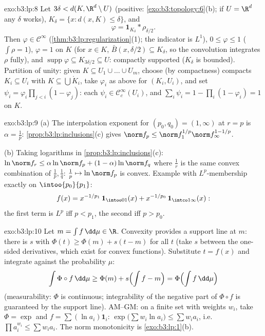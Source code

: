 \begin{solution}{exo:b3:lp:8}
Let $3\delta < d(K, \R^d\setminus U)$ (positive:
\cref{exo:b3:topology:6}(b); if $U = \R^d$ any $\delta$
works), $K_\delta = \{x : d(x, K) \leq \delta\}$, and
\[
\varphi = \mathbf 1_{K_\delta} * \rho_{\delta/2} .
\]
Then $\varphi \in \mathcal C^\infty$
(\cref{thm:b3:lp:regularization}(1); the indicator is $L^1$),
$0 \leq \varphi \leq 1$ ($\int\rho = 1$), $\varphi = 1$ on $K$
(for $x \in K$, $\bar B(x, \delta/2) \subseteq K_\delta$, so
the convolution integrates $\rho$ fully), and
$\operatorname{supp}\varphi \subseteq K_{3\delta/2} \subseteq
U$: compactly supported ($K_\delta$ is bounded). Partition of
unity: given $K \subseteq U_1\cup\dots\cup U_m$, choose (by
compactness) compacts $K_i \subseteq U_i$ with $K \subseteq
\bigcup \mathring K_i$, take $\varphi_i$ as above for $(K_i,
U_i)$, and set $\psi_i = \varphi_i\prod_{j <i}(1 -
\varphi_j)$: each $\psi_i \in \mathcal C_c^\infty(U_i)$, and
$\sum_i\psi_i = 1 - \prod_i(1 - \varphi_i) = 1$ on $K$.
\end{solution}

\begin{solution}{exo:b3:lp:9}
(a) The interpolation exponent for $(p_0, q_0) = (1, \infty)$
at $r = p$ is $\alpha = \frac1p$:
\cref{prop:b3:lp:inclusions}(c) gives $\norm f_p \leq \norm
f_1^{1/p}\norm f_\infty^{1 - 1/p}$.

(b) Taking logarithms in
\cref{prop:b3:lp:inclusions}(c): $\ln\norm f_r \leq
\alpha\ln\norm f_p + (1-\alpha)\ln\norm f_q$ where $\frac1r$
is the same convex combination of $\frac1p, \frac1q$: $\frac1p
\mapsto \ln\norm f_p$ is convex. Example with $L^p$-membership
exactly on $\intoo{p_0}{p_1}$:
\[
f(x) = x^{-1/p_1}\,\mathbf 1_{\intoo01}(x) +
x^{-1/p_0}\,\mathbf 1_{\intco1\infty}(x):
\]
the first term is $L^p$ iff $p < p_1$, the second iff $p >
p_0$.
\end{solution}

\begin{solution}{exo:b3:lp:10}
Let $m = \int f\,\dd\mu \in \R$. Convexity provides a support
line at $m$: there is $s$ with $\Phi(t) \geq \Phi(m) + s(t -
m)$ for all $t$ (take $s$ between the one-sided derivatives,
which exist for convex functions). Substitute $t = f(x)$ and
integrate against the probability $\mu$:
\[
\int\Phi\circ f\,\dd\mu \geq \Phi(m) + s\Bigl(\int f - m\Bigr)
= \Phi\Bigl(\int f\,\dd\mu\Bigr)
\]
(measurability: $\Phi$ is continuous; integrability of the
negative part of $\Phi\circ f$ is guaranteed by the support
line). AM--GM: on a finite set with weights $w_i$, take
$\Phi = \exp$ and $f = \sum(\ln a_i)\mathbf 1_i$:
$\exp\bigl(\sum w_i\ln a_i\bigr) \leq \sum w_ia_i$, i.e.\
$\prod a_i^{w_i} \leq \sum w_ia_i$. The norm monotonicity is
\cref{exo:b3:lp:1}(b).
\end{solution}

